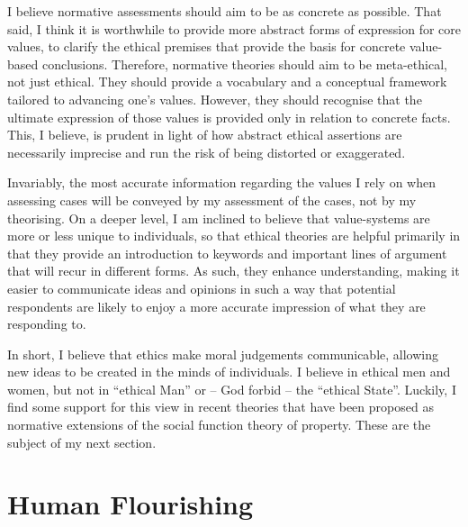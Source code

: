I believe normative assessments should aim to be as concrete as possible. That said, I think it is worthwhile to provide more abstract forms of expression for core values, to clarify the ethical premises that provide the basis for concrete value-based conclusions. Therefore, normative theories should aim to be meta-ethical, not just ethical. They should provide a vocabulary and a conceptual framework tailored to advancing one's values. However, they should recognise that the ultimate expression of those values is provided only in relation to concrete facts. This, I believe, is prudent in light of how abstract ethical assertions are necessarily imprecise and run the risk of being distorted or exaggerated.

Invariably, the most accurate information regarding the values I rely on when assessing cases will be conveyed by my assessment of the cases, not by my theorising. On a deeper level, I am inclined to believe that value-systems are more or less unique to individuals, so that ethical theories are helpful primarily in that they provide an introduction to keywords and important lines of argument that will recur in different forms. As such, they enhance understanding, making it easier to communicate ideas and opinions in such a way that potential respondents are likely to enjoy a more accurate impression of what they are responding to. 

In short, I believe that ethics make moral judgements communicable, allowing new ideas to be created in the minds of individuals. I believe in ethical men and women, but not in ``ethical Man'' or -- God forbid -- the ``ethical State''. Luckily, I find some support for this view in recent theories that have been proposed as normative extensions of the social function theory of property. These are the subject of my next section.

\section{Human Flourishing}\label{sec:hf}

